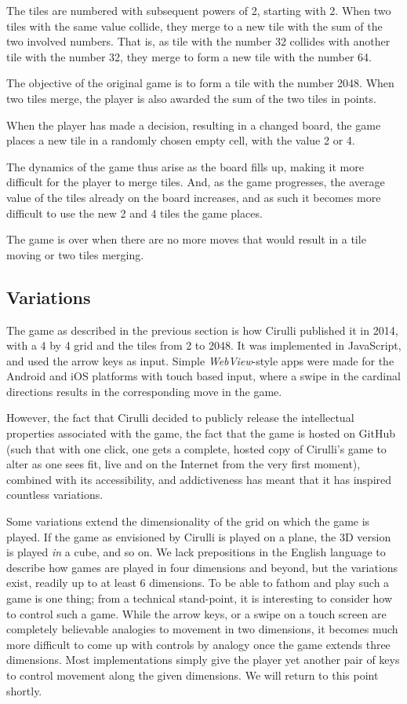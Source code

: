 \documentclass[a4paper, 12pt]{article}
\begin{document}
The tiles are numbered with subsequent powers of 2, starting with
2. When two tiles with the same value collide, they merge to a new
tile with the sum of the two involved numbers. That is, as tile with
the number 32 collides with another tile with the number 32, they
merge to form a new tile with the number 64.

The objective of the original game is to form a tile with the number
2048. When two tiles merge, the player is also awarded the sum of the
two tiles in points.

When the player has made a decision, resulting in a changed board, the
game places a new tile in a randomly chosen empty cell, with the value
2 or 4.

The dynamics of the game thus arise as the board fills up, making it
more difficult for the player to merge tiles. And, as the game
progresses, the average value of the tiles already on the board
increases, and as such it becomes more difficult to use the new 2 and
4 tiles the game places.

The game is over when there are no more moves that would result in a
tile moving or two tiles merging.

\subsection{Variations}

The game as described in the previous section is how Cirulli published
it in 2014, with a 4 by 4 grid and the tiles from 2 to 2048. It was
implemented in JavaScript, and used the arrow keys as input. Simple
\emph{WebView}-style apps were made for the Android and iOS platforms
with touch based input, where a swipe in the cardinal directions
results in the corresponding move in the game.

However, the fact that Cirulli decided to publicly release the
intellectual properties associated with the game, the fact that the
game is hosted on GitHub (such that with one click, one gets a
complete, hosted copy of Cirulli's game to alter as one sees fit, live
and on the Internet from the very first moment), combined with its
accessibility, and addictiveness has meant that it has inspired
countless variations.

Some variations extend the dimensionality of the grid on which the
game is played. If the game as envisioned by Cirulli is played on a
plane, the 3D version is played \emph{in} a cube, and so on. We lack
prepositions in the English language to describe how games are played
in four dimensions and beyond, but the variations exist, readily up to
at least 6 dimensions. To be able to fathom and play such a game is
one thing; from a technical stand-point, it is interesting to consider
how to control such a game. While the arrow keys, or a swipe on a
touch screen are completely believable analogies to movement in two
dimensions, it becomes much more difficult to come up with controls by
analogy once the game extends three dimensions. Most implementations
simply give the player yet another pair of keys to control movement
along the given dimensions. We will return to this point shortly.
\end{document}
